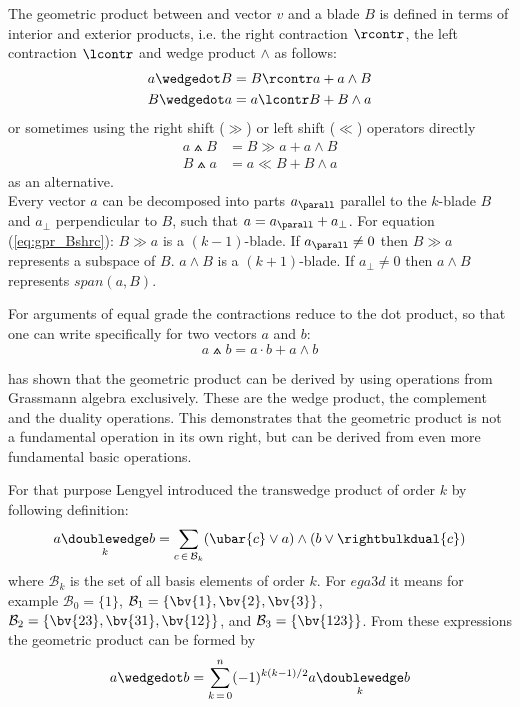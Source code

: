 The geometric product between and vector $v$ and a blade $B$ is defined in terms of
interior and exterior products, i.e. the right contraction $\rcontr$, the left contraction
$\lcontr$ and wedge product $\wedge$ as follows:
\begin{subequations}
    \begin{align}
    a \wedgedot B & =  B \rcontr a + a \wedge B
    \label{eq:gpr_Brc} \\
    B \wedgedot a & =  a \lcontr B + B \wedge a
    \label{eq:gpr_Blc}
    \end{align}
\end{subequations}
or sometimes using the right shift ($\gg$) or left shift ($\ll$) operators directly
\begin{subequations}
    \begin{align}
    a \wedgedot B & = B \gg a + a \wedge B
    \label{eq:gpr_Bshrc} \\
    B \wedgedot a & =  a \ll B + B \wedge a
    \label{eq:gpr_Bshlc}
    \end{align}
\end{subequations}
as an alternative. \\

Every vector $a$ can be decomposed into parts $a_{\parall}$ parallel to the $k$-blade $B$
and $a_{\perp}$ perpendicular to $B$, such that $a = a_{\parall} + a_{\perp}$. For
equation {(\ref{eq:gpr_Bshrc})}: $B \gg a$ is a $(k-1)$-blade. If $a_{\parall} \neq 0$
then $B \gg a$ represents a subspace of $B$. $a \wedge B$ is a $(k+1)$-blade. If
$a_{\perp} \neq 0$ then $a \wedge B$ represents $span(a,B)$.

For arguments of equal grade the contractions reduce to the dot product, so that one can
write specifically for two vectors $a$ and $b$:
\begin{equation}
    a \wedgedot b =  a \cdot b + a \wedge b
\end{equation}

\cite{Lengyel_transwedge_product:2025} has shown that the geometric product can be derived
by using operations from Grassmann algebra exclusively. These are the wedge product, the
complement and the duality operations. This demonstrates that the geometric product is not
a fundamental operation in its own right, but can be derived from even more fundamental
basic operations.

For that purpose Lengyel introduced the transwedge product of order $k$ by following
definition:
\begin{equation}
    a \underset{k}{\doublewedge} b = \sum_{c \, \in \, \mathcal{B}_k}
    (\ubar{c}\vee a) \wedge (b \vee \rightbulkdual{c})
    \label{eq:twdg_orig}
\end{equation}
where $\mathcal{B}_k$ is the set of all basis elements of order $k$. For $ega3d$ it means
for example $\mathcal{B}_0 = \{1\}$, $\mathcal{B}_1 = \{\bv{1}, \bv{2}, \bv{3}\}$,
$\mathcal{B}_2 = \{\bv{23}, \bv{31}, \bv{12}\}$, and $\mathcal{B}_3 = \{\bv{123}\}$. From
these expressions the geometric product can be formed by
\begin{equation}
    a \wedgedot b = \sum_{k \, = \, 0}^{n} (-1)^{k(k-1)/2} a \underset{k}{\doublewedge} b
    \label{eq:grp_twdg}
\end{equation}

